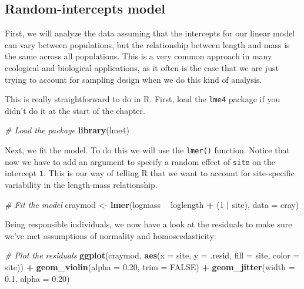 \documentclass[
]{book}
\newenvironment{Shaded}{\begin{snugshade}}{\end{snugshade}}
\newcommand{\CommentTok}[1]{\textcolor[rgb]{0.56,0.35,0.01}{\textit{#1}}}
\newcommand{\DataTypeTok}[1]{\textcolor[rgb]{0.13,0.29,0.53}{#1}}
\newcommand{\DecValTok}[1]{\textcolor[rgb]{0.00,0.00,0.81}{#1}}
\newcommand{\FloatTok}[1]{\textcolor[rgb]{0.00,0.00,0.81}{#1}}
\newcommand{\KeywordTok}[1]{\textcolor[rgb]{0.13,0.29,0.53}{\textbf{#1}}}
\newcommand{\NormalTok}[1]{#1}
\newcommand{\OperatorTok}[1]{\textcolor[rgb]{0.81,0.36,0.00}{\textbf{#1}}}
\newcommand{\OtherTok}[1]{\textcolor[rgb]{0.56,0.35,0.01}{#1}}
\newcommand{\StringTok}[1]{\textcolor[rgb]{0.31,0.60,0.02}{#1}}
\begin{document}
\hypertarget{random-intercepts-model}{%
\subsection{Random-intercepts model}\label{random-intercepts-model}}

First, we will analyze the data assuming that the intercepts for our linear model can vary between populations, but the relationship between length and mass is the same across all populations. This is a very common approach in many ecological and biological applications, as it often is the case that we are just trying to account for sampling design when we do this kind of analysis.

This is really straightforward to do in R. First, load the \texttt{lme4} package if you didn't do it at the start of the chapter.

\begin{Shaded}
\begin{Highlighting}[]
\CommentTok{# Load the package}
\KeywordTok{library}\NormalTok{(lme4)}
\end{Highlighting}
\end{Shaded}

Next, we fit the model. To do this we will use the \texttt{lmer()} function. Notice that now we have to add an argument to specify a random effect of \texttt{site} on the intercept \texttt{1}. This is our way of telling R that we want to account for site-specific variability in the length-mass relationship.

\begin{Shaded}
\begin{Highlighting}[]
\CommentTok{# Fit the model}
\NormalTok{craymod <-}\StringTok{ }\KeywordTok{lmer}\NormalTok{(logmass }\OperatorTok{~}\StringTok{ }\NormalTok{loglength }\OperatorTok{+}\StringTok{ }\NormalTok{(}\DecValTok{1} \OperatorTok{|}\StringTok{ }\NormalTok{site), }\DataTypeTok{data =}\NormalTok{ cray)}
\end{Highlighting}
\end{Shaded}

Being responsible individuals, we now have a look at the residuals to make sure we've met assumptions of normality and homoscedasticity:

\begin{Shaded}
\begin{Highlighting}[]
\CommentTok{# Plot the residuals}
\KeywordTok{ggplot}\NormalTok{(craymod, }\KeywordTok{aes}\NormalTok{(}\DataTypeTok{x =}\NormalTok{ site, }\DataTypeTok{y =}\NormalTok{ .resid, }\DataTypeTok{fill =}\NormalTok{ site, }\DataTypeTok{color =}\NormalTok{ site)) }\OperatorTok{+}
\StringTok{  }\KeywordTok{geom_violin}\NormalTok{(}\DataTypeTok{alpha =} \FloatTok{0.20}\NormalTok{, }\DataTypeTok{trim =} \OtherTok{FALSE}\NormalTok{) }\OperatorTok{+}
\StringTok{  }\KeywordTok{geom_jitter}\NormalTok{(}\DataTypeTok{width =} \FloatTok{0.1}\NormalTok{, }\DataTypeTok{alpha =} \FloatTok{0.20}\NormalTok{)}
\end{Highlighting}
\end{Shaded}
\end{document}
